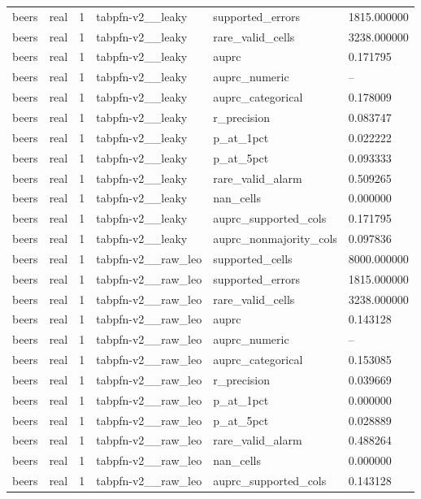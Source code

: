 \begin{tabular}{llllll}
beers & real & 1 & tabpfn-v2\_\_leaky & supported\_errors & 1815.000000 \\
beers & real & 1 & tabpfn-v2\_\_leaky & rare\_valid\_cells & 3238.000000 \\
beers & real & 1 & tabpfn-v2\_\_leaky & auprc & 0.171795 \\
beers & real & 1 & tabpfn-v2\_\_leaky & auprc\_numeric & -- \\
beers & real & 1 & tabpfn-v2\_\_leaky & auprc\_categorical & 0.178009 \\
beers & real & 1 & tabpfn-v2\_\_leaky & r\_precision & 0.083747 \\
beers & real & 1 & tabpfn-v2\_\_leaky & p\_at\_1pct & 0.022222 \\
beers & real & 1 & tabpfn-v2\_\_leaky & p\_at\_5pct & 0.093333 \\
beers & real & 1 & tabpfn-v2\_\_leaky & rare\_valid\_alarm & 0.509265 \\
beers & real & 1 & tabpfn-v2\_\_leaky & nan\_cells & 0.000000 \\
beers & real & 1 & tabpfn-v2\_\_leaky & auprc\_supported\_cols & 0.171795 \\
beers & real & 1 & tabpfn-v2\_\_leaky & auprc\_nonmajority\_cols & 0.097836 \\
beers & real & 1 & tabpfn-v2\_\_raw\_leo & supported\_cells & 8000.000000 \\
beers & real & 1 & tabpfn-v2\_\_raw\_leo & supported\_errors & 1815.000000 \\
beers & real & 1 & tabpfn-v2\_\_raw\_leo & rare\_valid\_cells & 3238.000000 \\
beers & real & 1 & tabpfn-v2\_\_raw\_leo & auprc & 0.143128 \\
beers & real & 1 & tabpfn-v2\_\_raw\_leo & auprc\_numeric & -- \\
beers & real & 1 & tabpfn-v2\_\_raw\_leo & auprc\_categorical & 0.153085 \\
beers & real & 1 & tabpfn-v2\_\_raw\_leo & r\_precision & 0.039669 \\
beers & real & 1 & tabpfn-v2\_\_raw\_leo & p\_at\_1pct & 0.000000 \\
beers & real & 1 & tabpfn-v2\_\_raw\_leo & p\_at\_5pct & 0.028889 \\
beers & real & 1 & tabpfn-v2\_\_raw\_leo & rare\_valid\_alarm & 0.488264 \\
beers & real & 1 & tabpfn-v2\_\_raw\_leo & nan\_cells & 0.000000 \\
beers & real & 1 & tabpfn-v2\_\_raw\_leo & auprc\_supported\_cols & 0.143128 \\

\end{tabular}
